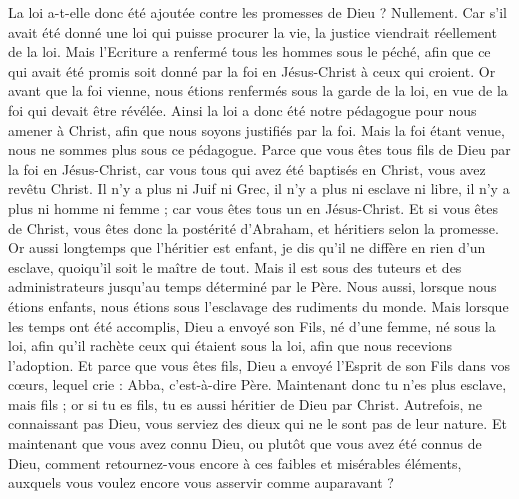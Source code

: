 \begin{multicols}{2}
La loi a-t-elle donc été ajoutée contre les promesses de Dieu ? Nullement. Car s’il avait été donné une loi qui puisse procurer la vie, la justice viendrait réellement de la loi.
Mais l'Ecriture a renfermé tous les hommes sous le péché, afin que ce qui avait été promis soit donné par la foi en Jésus-Christ à ceux qui croient.
Or avant que la foi vienne, nous étions renfermés sous la garde de la loi, en vue de la foi qui devait être révélée.
Ainsi la loi a donc été notre pédagogue pour nous amener à Christ, afin que nous soyons justifiés par la foi.
Mais la foi étant venue, nous ne sommes plus sous ce pédagogue.
Parce que vous êtes tous fils de Dieu par la foi en Jésus-Christ,
car vous tous qui avez été baptisés en Christ, vous avez revêtu Christ.
Il n'y a plus ni Juif ni Grec, il n’y a plus ni esclave ni libre, il n’y a plus ni homme ni femme ; car vous êtes tous un en Jésus-Christ.
Et si vous êtes de Christ, vous êtes donc la postérité d'Abraham, et héritiers selon la promesse.
\VerseOne{}Or aussi longtemps que l’héritier est enfant, je dis qu’il ne diffère en rien d’un esclave, quoiqu’il soit le maître de tout.
Mais il est sous des tuteurs et des administrateurs jusqu'au temps déterminé par le Père.
Nous aussi, lorsque nous étions enfants, nous étions sous l’esclavage des rudiments du monde.
Mais lorsque les temps ont été accomplis, Dieu a envoyé son Fils, né d'une femme, né sous la loi,
afin qu'il rachète ceux qui étaient sous la loi, afin que nous recevions l'adoption.
Et parce que vous êtes fils, Dieu a envoyé l'Esprit de son Fils dans vos cœurs, lequel crie : Abba, c'est-à-dire Père.
Maintenant donc tu n'es plus esclave, mais fils ; or si tu es fils, tu es aussi héritier de Dieu par Christ.
Autrefois, ne connaissant pas Dieu, vous serviez des dieux qui ne le sont pas de leur nature.
Et maintenant que vous avez connu Dieu, ou plutôt que vous avez été connus de Dieu, comment retournez-vous encore à ces faibles et misérables éléments, auxquels vous voulez encore vous asservir comme auparavant ?

\end{multicols}
